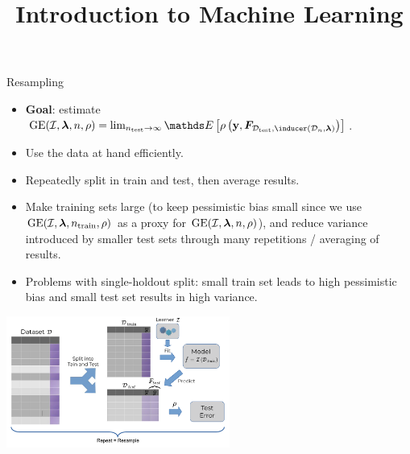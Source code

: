 \documentclass[11pt,compress,t,notes=noshow, xcolor=table]{beamer}
\title{Introduction to Machine Learning}
\institute{\href{https://compstat-lmu.github.io/lecture_i2ml/}{compstat-lmu.github.io/lecture\_i2ml}}
\date{}
\begin{document}












\begin{vbframe}{Resampling}

\begin{footnotesize}
\begin{itemize}
  \item \textbf{Goal}: estimate $\GEfull[n] =
  \lim_{\ntest \rightarrow \infty} \E \left[ \rho \left(
  \yv, \F_{\Dtest, \inducer(\D_n, \lamv)} 
  \right)\right]$.
   \item Use the data at hand efficiently.
   \item Repeatedly split in train and test, then average results.
  \item Make training sets large (to keep pessimistic bias small since we use 
  $\GEfull$ as a proxy for $\GEfull[n]$),
  and reduce variance introduced by smaller test sets through many repetitions / 
  averaging of results.
  \item Problems with single-holdout split: small train set leads to high 
  pessimistic bias and small test set results in high variance.
\end{itemize}
\end{footnotesize}

\begin{center}
\includegraphics[width=0.55\textwidth]{figure_man/resampling_error.pdf}
\end{center}

\end{vbframe}
\end{document}

